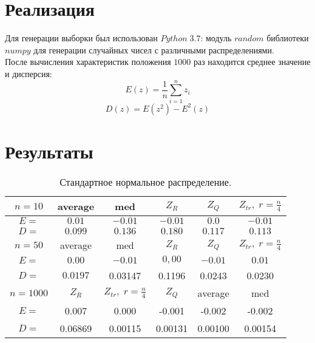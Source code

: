 \documentclass[a4]{article}
\begin{document}
	\section{Реализация}
	Для генерации выборки был использован $Python\;3.7$: модуль $random$ библиотеки $numpy$ для генерации случайных чисел с различными распределениями.\\
	После вычисления характеристик положения $1000$ раз находится среднее значение и дисперсия: 
	\begin{equation}
	E(z) = \frac{1}{n}\sum_{i=1}^n z_i
	\end{equation} 
	\begin{equation}
	D(z) = E\left(z^2\right) - E^2(z)
	\end{equation}
	
	\section{Результаты}
		\begin{table}[h]
			\caption{ Стандартное нормальное распределение.}
			\begin{center}
				\begin{tabular}{|c|c|c|c|c|c|}
					\hline
					$n = 10$ & average & med & $Z_R$ & $Z_Q$ & $Z_{tr},\;r=\frac{n}{4}$\\
					\hline
					$E =$ & $0.01$ & $-0.01$ &        $-0.01$ &       $0.0$ &         $-0.01$\\
					\hline
					$D =$ & $0.099$&         $0.136$        & $0.180$     &    $0.117$      &   $0.113$\\
					\hline
					$n = 50$ & average & med & $Z_R$ & $Z_Q$ & $Z_{tr},\;r=\frac{n}{4}$\\
					\hline
					$E =$ & $0.00$ & $-0.01$ & $0,00$ & $-0.01$ & $0.01$\\
					\hline
					$D =$ & $0.0197$&         0.03147        & 0.1196      &   0.0243       &  0.0230\\
					\hline
					$n = 1000$ & $Z_R$  & $Z_{tr},\;r=\frac{n}{4}$  &  $Z_Q$ & average & med\\
					\hline
					$E =$ & 0.007&        0.000&                 -0.001 & -0.002       & -0.002\\
					\hline
					$D =$ & 0.06869  &  0.00115    &    0.00131  &0.00100        & 0.00154      \\
					\hline
				\end{tabular}
			\end{center}
		\end{table}
\end{document}

